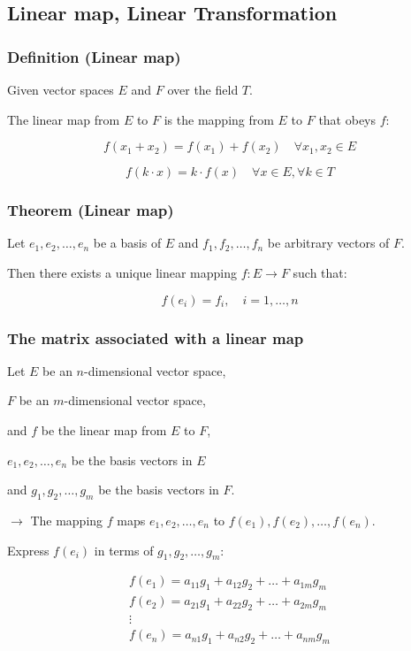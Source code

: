 \subsection{Linear map, Linear Transformation}

\subsubsection{Definition (Linear map)}

Given vector spaces $E$ and $F$ over the field $T$.

The linear map from $E$ to $F$ is the mapping from $E$ to $F$ that obeys $f$:

\[
f(x_1 + x_2) = f(x_1) + f(x_2) \quad \forall x_1, x_2 \in E
\]

\[
f(k \cdot x) = k \cdot f(x) \quad \forall x \in E, \forall k \in T
\]

\subsubsection{Theorem (Linear map)}

Let $e_1, e_2, \ldots, e_n$ be a basis of $E$ and $f_1, f_2, \ldots, f_n$ be arbitrary vectors of $F$.

Then there exists a unique linear mapping $f: E \to F$ such that:

\[
f(e_i) = f_i, \quad i = 1, \ldots, n
\]

\subsubsection{The matrix associated with a linear map}

Let $E$ be an $n$-dimensional vector space, 

$F$ be an $m$-dimensional vector space, 

and $f$ be the linear map from $E$ to $F$, 

$e_1, e_2, \ldots, e_n$ be the basis vectors in $E$ 

and $g_1, g_2, \ldots, g_m$ be the basis vectors in $F$.

$\rightarrow$ The mapping $f$ maps $e_1, e_2, \ldots, e_n$ to $f(e_1), f(e_2), \ldots, f(e_n)$.

Express $f(e_i)$ in terms of $g_1, g_2, \ldots, g_m$:

\begin{equation*}
    \begin{matrix}
        f(e_1) = a_{11} g_1 + a_{12} g_2 + \ldots + a_{1m} g_m\\
        f(e_2) = a_{21} g_1 + a_{22} g_2 + \ldots + a_{2m} g_m\\
        \vdots\\
        f(e_n) = a_{n1} g_1 + a_{n2} g_2 + \ldots + a_{nm} g_m
    \end{matrix}
\end{equation*}


